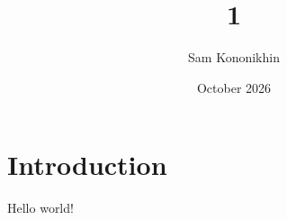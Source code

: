 \documentclass{article}
\title{1}
\author{Sam Kononikhin}
\date{October 2026}
\begin{document}
\maketitle

\section{Introduction}
Hello world!
\end{document}
